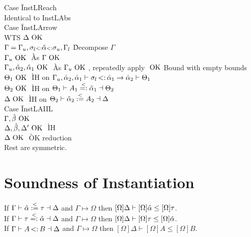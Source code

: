 \documentclass{report}
\begin{document}
\begin{tabbing}
Case \=InstLReach\\
\>Identical to InstLAbs\\
Case \=InstLArrow\\
\>WTS $\Delta \text{ OK }$\\
\>$\Gamma = \Gamma_u,\sigma_{l} {\scriptstyle{<:}} \hat{\alpha} {\scriptstyle{<:}} \sigma_{u},\Gamma_l$ \` Decompose $\Gamma$\\
\>$\Gamma_u\text{ OK }$ \` As $\Gamma \text{ OK }$\\
\>$\Gamma_u,\hat{\alpha}_2,\hat{\alpha}_1 \text{ OK }$ \` As $\Gamma_u\text{ OK }$, repeatedly apply $\text{ OK }$Bound with empty bounds\\
\>$\Theta_1 \text{ OK }$ \` IH on $\Gamma_u,\alphahat_2,\alphahat_1 \vdash \sigma_l \st \alphahat_1 \rightarrow \alphahat_2 \vdash \Theta_1$\\
\>$\Theta_2 \text{ OK }$ \` IH on $\Theta_1 \vdash A_1 \overset{<}{=:} \hat{\alpha}_1 \dashv \Theta_2$\\
\>$\Delta \text{ OK }$ \` IH on $\Theta_2 \vdash \hat{\alpha}_2 \overset{<}{:=} A_2 \dashv \Delta$\\
Case \=InstLAIIL\\
\>$\Gamma,\hat{\beta} \text{ OK }$\\
\>$\Delta,\hat{\beta},\Delta' \text{ OK }$ \` IH\\
\>$\Delta\text{ OK }$ \` OK reduction\\
Rest are symmetric.\\
\end{tabbing}

\section{Soundness of Instantiation}
If $\Gamma \vdash \hat{\alpha} \overset{<}{:=} \tau \dashv \Delta$ and $\Gamma \mapsto \Omega$ then $[\Omega]\Delta \vdash [\Omega]\hat{\alpha} \leq [\Omega]\tau$.\\
If $\Gamma \vdash \tau \overset{<}{=:} \hat{\alpha} \dashv \Delta$ and $\Gamma \mapsto \Omega$ then $[\Omega]\Delta \vdash [\Omega]\tau \leq [\Omega]\hat{\alpha}$.\\
If $\Gamma \vdash A \st B \dashv \Delta$ and $\Gamma \mapsto \Omega$ then $[\Omega]\Delta \vdash [\Omega]A \leq [\Omega]B$.\\
\end{document}
